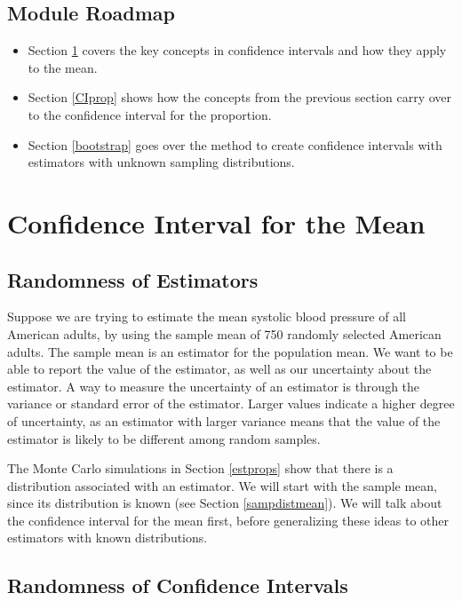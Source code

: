 \documentclass[
]{book}
\providecommand{\tightlist}{%
  \setlength{\itemsep}{0pt}\setlength{\parskip}{0pt}}
\begin{document}
\hypertarget{module-roadmap-6}{%
\subsection{Module Roadmap}\label{module-roadmap-6}}

\begin{itemize}
\tightlist
\item
  Section \ref{CImean} covers the key concepts in confidence intervals and how they apply to the mean.
\item
  Section \ref{CIprop} shows how the concepts from the previous section carry over to the confidence interval for the proportion.
\item
  Section \ref{bootstrap} goes over the method to create confidence intervals with estimators with unknown sampling distributions.
\end{itemize}

\hypertarget{CImean}{%
\section{Confidence Interval for the Mean}\label{CImean}}

\hypertarget{randomness-of-estimators}{%
\subsection{Randomness of Estimators}\label{randomness-of-estimators}}

Suppose we are trying to estimate the mean systolic blood pressure of all American adults, by using the sample mean of 750 randomly selected American adults. The sample mean is an estimator for the population mean. We want to be able to report the value of the estimator, as well as our uncertainty about the estimator. A way to measure the uncertainty of an estimator is through the variance or standard error of the estimator. Larger values indicate a higher degree of uncertainty, as an estimator with larger variance means that the value of the estimator is likely to be different among random samples.

The Monte Carlo simulations in Section \ref{estprops} show that there is a distribution associated with an estimator. We will start with the sample mean, since its distribution is known (see Section \ref{sampdistmean}). We will talk about the confidence interval for the mean first, before generalizing these ideas to other estimators with known distributions.

\hypertarget{randomness-of-confidence-intervals}{%
\subsection{Randomness of Confidence Intervals}\label{randomness-of-confidence-intervals}}
\end{document}

